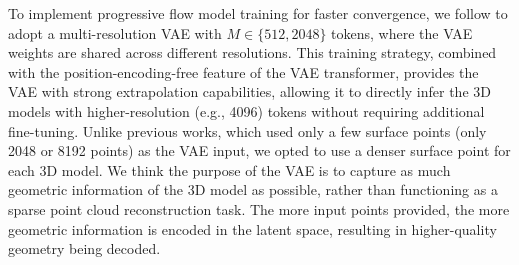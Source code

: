 To implement progressive flow model training for faster convergence, we follow \cite{zhang2024clay} to adopt a multi-resolution VAE with $M \in \{512, 2048\}$ tokens, where the VAE weights are shared across different resolutions.
This training strategy, combined with the position-encoding-free feature of the VAE transformer, provides the VAE with strong extrapolation capabilities, allowing it to directly infer the 3D models with higher-resolution (e.g., 4096) tokens without requiring additional fine-tuning.
Unlike previous works, which used only a few surface points (only 2048 or 8192 points)\cite{zhang2024clay} as the VAE input, we opted to use a denser surface point for each 3D model.
We think the purpose of the VAE is to capture as much geometric information of the 3D model as possible, rather than functioning as a sparse point cloud reconstruction task.
The more input points provided, the more geometric information is encoded in the latent space, resulting in higher-quality geometry being decoded.
